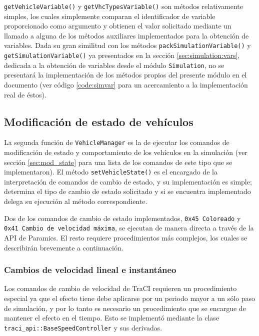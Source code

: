 \texttt{getVehicleVariable()} y \texttt{getVhcTypesVariable()} son métodos relativamente simples, los cuales simplemente comparan el identificador de variable proporcionado como argumento y obtienen el valor solicitado mediante un llamado a alguna de los métodos auxiliares implementados para la obtención de variables. Dada su gran similitud con los métodos \texttt{packSimulationVariable()} y \texttt{getSimulationVariable()} ya presentados en la sección \ref{sec:simulation:vars}, dedicada a la obtención de variables desde el módulo \texttt{Simulation}, no se presentará la implementación de los métodos propios del presente módulo en el documento (ver código \ref{code:simvar} para un acercamiento a la implementación real de éstos).

\subsection{Modificación de estado de vehículos}

La segunda función de \texttt{VehicleManager} es la de ejecutar los comandos de modificación de estado y comportamiento de los vehículos en la simulación (ver sección \ref{sec:mod_state} para una lista de los comandos de este tipo que se implementaron). El método \texttt{setVehicleState()} es el encargado de la interpretación de comandos de cambio de estado, y su implementación es simple; determina el tipo de cambio de estado solicitado y si se encuentra implementado delega su ejecución al método correspondiente.

Dos de los comandos de cambio de estado implementados, \texttt{0x45 Coloreado} y \texttt{0x41 Cambio de velocidad máxima}, se ejecutan de manera directa a través de la API de Paramics. El resto requiere procedimientos más complejos, los cuales se describirán brevemente a continuación.

\subsubsection{Cambios de velocidad lineal e instantáneo}\label{sec:speedoverride}

Los comandos de cambio de velocidad de TraCI requieren un procedimiento especial ya que el efecto tiene debe aplicarse por un periodo mayor a un sólo paso de simulación, y por lo tanto es necesario un procedimiento que se encargue de mantener el efecto en el tiempo. Esto se implementó mediante la clase \texttt{traci\_api::BaseSpeedController} y sus derivadas.

